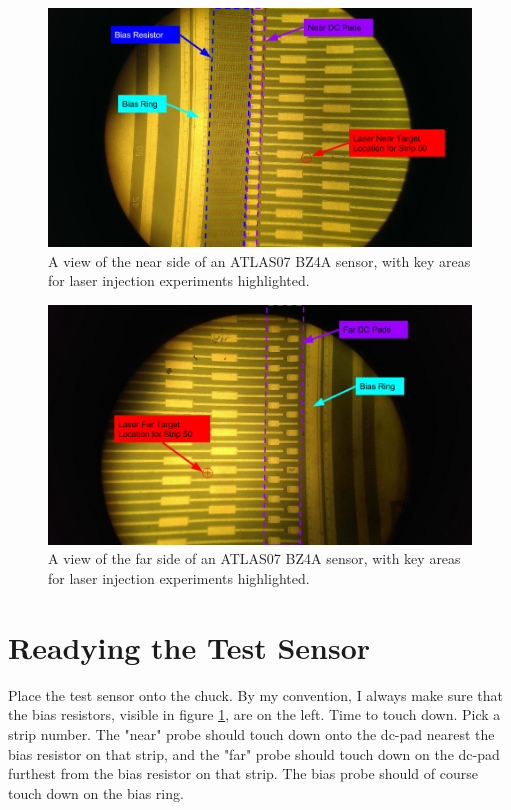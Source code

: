 \documentclass{report}
\begin{document}
            \begin{figure}[h] 
                \includegraphics[width=\textwidth]{sensor_near}
                \centering
                \caption{ A view of the near side of an ATLAS07 BZ4A sensor, with key areas for laser injection experiments highlighted. }
                \label{fig:sensor_near}
            \end{figure}

            \begin{figure}[h] 
                \includegraphics[width=\textwidth]{sensor_far}
                \centering
                \caption{ A view of the far side of an ATLAS07 BZ4A sensor, with key areas for laser injection experiments highlighted. }
                \label{fig:sensor_far}
            \end{figure}

        \section{ Readying the Test Sensor }
            Place the test sensor onto the chuck. By my convention, I always make sure that the bias resistors, visible in figure \ref{fig:sensor_near}, are on the left. Time to touch down. Pick a strip number. The "near" probe should touch down onto the dc-pad nearest the bias resistor on that strip, and the "far" probe should touch down on the dc-pad furthest from the bias resistor on that strip. The bias probe should of course touch down on the bias ring.
\end{document}
